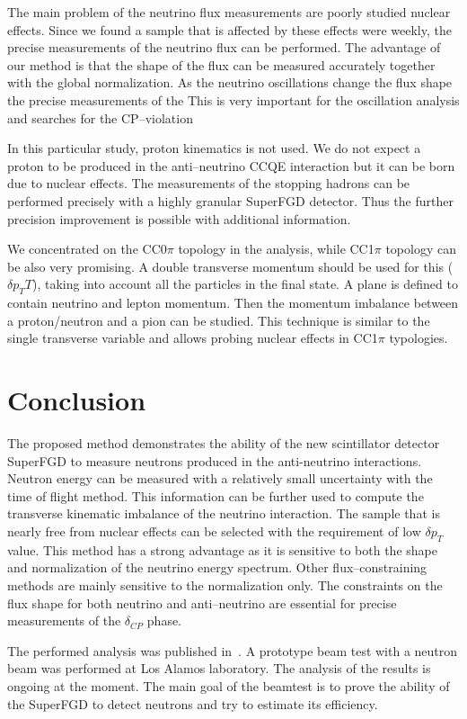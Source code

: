 \documentclass[main.tex]{subfiles}
\begin{document}
The main problem of the neutrino flux measurements are poorly studied nuclear effects. Since we found a sample that is affected by these effects were weekly, the precise measurements of the neutrino flux can be performed. The advantage of our method is that the shape of the flux can be measured accurately together with the global normalization. As the neutrino oscillations change the flux shape the precise measurements of the
This is very important for the oscillation analysis and searches for the CP--violation

In this particular study, proton kinematics is not used. We do not expect a proton to be produced in the anti--neutrino CCQE interaction but it can be born due to nuclear effects. The measurements of the stopping hadrons can be performed precisely with a highly granular SuperFGD detector. Thus the further precision improvement is possible with additional information.

We concentrated on the CC0$\pi$ topology in the analysis, while CC1$\pi$ topology can be also very promising. A double transverse momentum should be used for this ($\delta p_TT$), taking into account all the particles in the final state. A plane is defined to contain neutrino and lepton momentum. Then the momentum imbalance between a proton/neutron and a pion can be studied. This technique is similar to the single transverse variable and allows probing nuclear effects in CC1$\pi$ typologies.

\section{Conclusion}
The proposed method demonstrates the ability of the new scintillator detector SuperFGD to measure neutrons produced in the anti-neutrino interactions. Neutron energy can be measured with a relatively small uncertainty with the time of flight method. This information can be further used to compute the transverse kinematic imbalance of the neutrino interaction. The sample that is nearly free from nuclear effects can be selected with the requirement of low $\delta p_T$ value. This method has a strong advantage as it is sensitive to both the shape and normalization of the neutrino energy spectrum. Other flux--constraining methods are mainly sensitive to the normalization only. The constraints on the flux shape for both neutrino and anti--neutrino are essential for precise measurements of the $\delta_{CP}$ phase.

The performed analysis was published in~\cite{Munteanu2019}. A prototype beam test with a neutron beam was performed at Los Alamos laboratory. The analysis of the results is ongoing at the moment. The main goal of the beamtest is to prove the ability of the SuperFGD to detect neutrons and try to estimate its efficiency.
\end{document}
